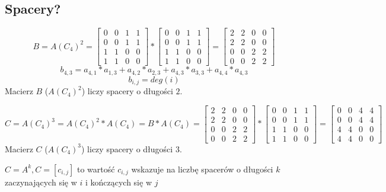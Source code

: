 \subsection{Spacery?}
$$B=A(C_4)^2=\begin{bmatrix}
0 & 0 & 1 & 1\\ 
0 & 0 & 1 & 1\\ 
1 & 1 & 0 & 0\\ 
1 & 1 & 0 & 0
\end{bmatrix}*\begin{bmatrix}
0 & 0 & 1 & 1\\ 
0 & 0 & 1 & 1\\ 
1 & 1 & 0 & 0\\ 
1 & 1 & 0 & 0
\end{bmatrix} = \begin{bmatrix}
2 & 2 & 0 & 0\\ 
2 & 2 & 0 & 0\\ 
0 & 0 & 2 & 2\\ 
0 & 0 & 2 & 2
\end{bmatrix}$$
$$b_{4,3}=a_{4,1}*a_{1,3}+a_{4,2}*a_{2,3}+a_{4,3}*a_{3,3}+a_{4,4}*a_{4,3}$$
$$b_{i,j}=deg(i)$$
Macierz $B$ ($A(C_4)^2$) liczy spacery o długości $2$.



$$C=A(C_4)^3=A(C_4)^2*A(C_4)=B*A(C_4)=
\begin{bmatrix}
2 & 2 & 0 & 0\\ 
2 & 2 & 0 & 0\\ 
0 & 0 & 2 & 2\\ 
0 & 0 & 2 & 2
\end{bmatrix}*
\begin{bmatrix}
0 & 0 & 1 & 1\\ 
0 & 0 & 1 & 1\\ 
1 & 1 & 0 & 0\\ 
1 & 1 & 0 & 0
\end{bmatrix} = \begin{bmatrix}
0 & 0 & 4 & 4\\ 
0 & 0 & 4 & 4\\ 
4 & 4 & 0 & 0\\ 
4 & 4 & 0 & 0
\end{bmatrix}$$
Macierz $C$ ($A(C_4)^3$) liczy spacery o długości $3$.

\begin{fact*}
$C=A^k, C=[c_{i,j}]$ to wartość $c_{i,j}$ wskazuje na liczbę spacerów o długości $k$ zaczynających się w $i$ i kończących się w $j$
\end{fact*}

